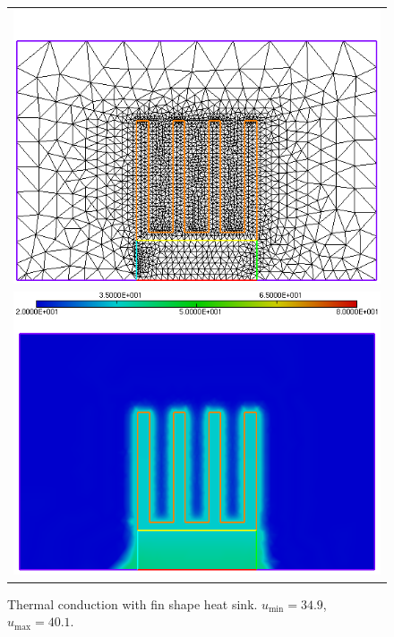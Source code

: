 \begin{figure}[h!]
	\centering
	\begin{tabular}{c}
		\includegraphics[width=.8\linewidth]{figures/finsinkc} \\ \includegraphics[width=.8\linewidth]{figures/finsinkb}
	\end{tabular}
	\caption{Thermal conduction with fin shape heat sink. $u_{\min}=34.9$, $u_{\max}=40.1$.}
	\label{fig:finsink}
\end{figure}


